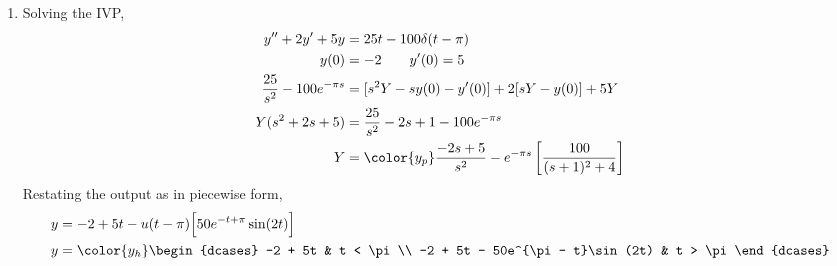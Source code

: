\begin{enumerate}
    \item Solving the IVP,
          \begin{align}
              y'' + 2y' + 5y                 & = 25t - 100\delta(t - \pi)        \\
              y(0)                           & = -2 \qquad y'(0) = 5             \\
              \frac{25}{s^2} - 100e^{-\pi s} & = [s^2Y - sy(0) - y'(0)] +
              2[sY - y(0)] + 5Y                                                  \\
              Y(s^2 + 2s  + 5)               & = \frac{25}{s^2} - 2s + 1
              - 100e^{-\pi s}                                                    \\
              Y                              & = \color{y_p} \frac{-2s + 5}{s^2}
              - e^{-\pi s} \left[
                  \frac{100}{(s+1)^2 + 4} \right]
          \end{align}
          Restating the output as in piecewise form,
          \begin{align}
              y & = -2 + 5t - u(t-\pi) \Big[ 50e^{-t + \pi}\sin(2t) \Big] \\
              y & = \color{y_h}
              \begin{dcases}
                  -2 + 5t                         & t < \pi \\
                  -2 + 5t - 50e^{\pi - t}\sin(2t) & t > \pi
              \end{dcases}
          \end{align}
          \begin{figure}[H]
              \centering
          \end{figure}


\end{enumerate}
